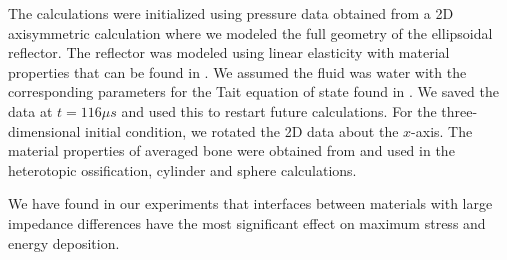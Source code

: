 \documentclass{article}
\begin{document}
The calculations were initialized using pressure data obtained from a 2D axisymmetric calculation where we modeled the full geometry of the ellipsoidal reflector.  The reflector was modeled using linear elasticity with material properties that can be found in \cite{fagnan:phd}.  We assumed the fluid was water with the corresponding parameters for the Tait equation of state found in .   We saved the data at $t=116\mu s$ and used this to restart future calculations.  For the three-dimensional initial condition, we rotated the 2D data about the $x$-axis.  The material properties of averaged bone were obtained from \cite{martin_burr_sharkey} and used in the heterotopic ossification, cylinder and sphere calculations.  

We have found in our experiments that interfaces between materials with large impedance differences have the most significant effect on maximum stress and energy deposition.
\end{document}
